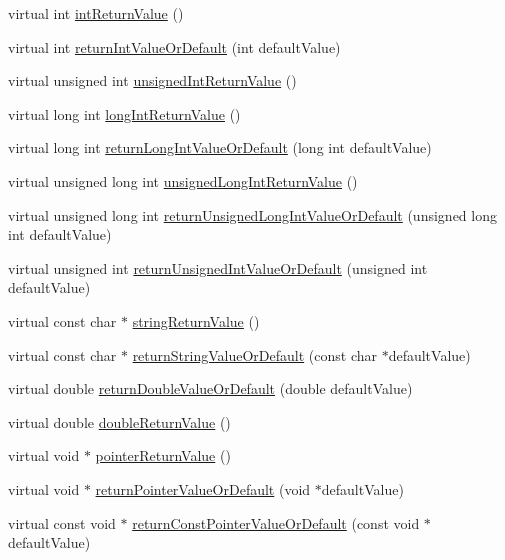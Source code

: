 \begin{DoxyCompactItemize}
\item 
virtual int \hyperlink{class_mock_support_ad27aa894e1bba65bffb4d20980ef1bb5}{int\+Return\+Value} ()
\item 
virtual int \hyperlink{class_mock_support_a27871a6b006166fa4d2b152211745d90}{return\+Int\+Value\+Or\+Default} (int default\+Value)
\item 
virtual unsigned int \hyperlink{class_mock_support_af17f536f5322c6a1799f03d6601055b2}{unsigned\+Int\+Return\+Value} ()
\item 
virtual long int \hyperlink{class_mock_support_a8156fc063e7ff0ac938c5c5b2421de26}{long\+Int\+Return\+Value} ()
\item 
virtual long int \hyperlink{class_mock_support_a5157127c7bcc35b9f3dfea0f4142520e}{return\+Long\+Int\+Value\+Or\+Default} (long int default\+Value)
\item 
virtual unsigned long int \hyperlink{class_mock_support_a5b08680680bd5ad5260ec4946d4e2c11}{unsigned\+Long\+Int\+Return\+Value} ()
\item 
virtual unsigned long int \hyperlink{class_mock_support_a7602113b7643d10935afabe4bf9bb78a}{return\+Unsigned\+Long\+Int\+Value\+Or\+Default} (unsigned long int default\+Value)
\item 
virtual unsigned int \hyperlink{class_mock_support_a885ff0783a707cc5caa907deb87f39b5}{return\+Unsigned\+Int\+Value\+Or\+Default} (unsigned int default\+Value)
\item 
virtual const char $\ast$ \hyperlink{class_mock_support_a5e8093852461513aa2cbc3fa2b925121}{string\+Return\+Value} ()
\item 
virtual const char $\ast$ \hyperlink{class_mock_support_a28cf50cc7a592d780b12d216c0ceed70}{return\+String\+Value\+Or\+Default} (const char $\ast$default\+Value)
\item 
virtual double \hyperlink{class_mock_support_afeb3115ce764c1712ead3d98f2e1d395}{return\+Double\+Value\+Or\+Default} (double default\+Value)
\item 
virtual double \hyperlink{class_mock_support_a893722392476019280e7d6a281cdaf01}{double\+Return\+Value} ()
\item 
virtual void $\ast$ \hyperlink{class_mock_support_ad0358b00f36ebcb855bfdb6ca606d27f}{pointer\+Return\+Value} ()
\item 
virtual void $\ast$ \hyperlink{class_mock_support_ab18879d6761c65b8e952b7da6563a335}{return\+Pointer\+Value\+Or\+Default} (void $\ast$default\+Value)
\item 
virtual const void $\ast$ \hyperlink{class_mock_support_a3b4ea5e0dcb393aa1461794d413ba0cc}{return\+Const\+Pointer\+Value\+Or\+Default} (const void $\ast$default\+Value)

\end{DoxyCompactItemize}
